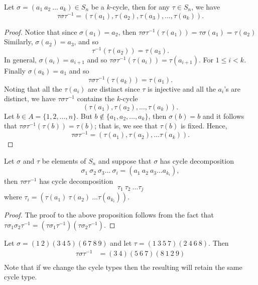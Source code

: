 \begin{lemma}
    Let \( \sigma = ({a}_{1} \ {a}_{2} \ \dots \ {a}_{k}) \in {S}_{n} \) be a \( k \)-cycle, then for any \( \tau \in {S}_{n} \), we have \[ \tau \sigma \tau^{-1} = (\tau({a}_{1}), \tau({a}_{2}), \tau({a}_{3}), \dots, \tau({a}_{k})).  \]
\end{lemma}
\begin{proof}
Notice that since \( \sigma({a}_{1}) = {a}_{2} \), then \( \tau \sigma \tau^{-1} ( \tau({a}_{1})) = \tau \sigma ({a}_{1}) = \tau({a}_{2})  \) Similarly, \( \sigma({a}_{2}) = {a}_{3} \), and so  
\[  \tau^{-1}(\tau({a}_{2}))  = \tau({a}_{3}).\]
In general, \( \sigma({a}_{i}) = {a}_{i+1} \) and so \( \tau \sigma \tau^{-1} (\tau({a}_{i})) = \tau({a}_{i+1}) \). For \( 1 \leq i < k  \). Finally \( \sigma({a}_{k}) =  {a}_{1} \) and so  
\[  \tau \sigma \tau^{-1} (\tau({a}_{k})) = \tau({a}_{1}). \]
Noting that all the \( \tau({a}_{i}) \) are distinct since \( \tau  \) is injective and all the \( {a}_{i} \)'s are distinct, we have \( \tau \sigma \tau^{-1} \) contains the \( k  \)-cycle 
\[  (\tau({a}_{1}), \tau({a}_{2}), \dots, \tau({a}_{k})). \]
Let \( b \in A = \{  1, 2, \dots, n \}  \). But \( b \notin \{ {a}_{1}, {a}_{2}, \dots, {a}_{k} \}  \), then \( \sigma(b) = b \) and it follows that \( \tau \sigma \tau^{-1} (\tau(b)) = \tau(b) \); that is, we see that \( \tau(b) \) is fixed. Hence,  
\[  \tau \sigma \tau^{-1} = (\tau({a}_{1}), \tau({a}_{2}), \dots \tau({a}_{k})). \]
\end{proof}

\begin{prop}
    Let \( \sigma  \) and \( \tau \) be elements of \( {S}_{n} \) and suppose that \( \sigma  \) has cycle decomposition 
    \[  {\sigma}_{1} \ {\sigma}_{2} \ {\sigma}_{3} \dots \ {\sigma}_{i} = ({a}_{1} \ a_{2} \ {a}_{3} \dots {a}_{{k}_{i}}),  \]
    then \( \tau \sigma \tau^{-1} \) has cycle decomposition
    \[  {\tau}_{1} \ {\tau}_{2} \ \dots {\tau}_{j} \]
    where \( {\tau}_{i} = (\tau({a}_{1}) \ \tau({a}_{2}) \ \dots \tau({a}_{{k}_{i}})) \).
\end{prop}
\begin{proof}
The proof to the above proposition follows from the fact that \( \tau {\sigma}_{1} {\sigma}_{2} \tau^{-1} = (\tau {\sigma}_{1} \tau^{-1}) (\tau {\sigma}_{2} \tau^{-1}) \). 
\end{proof}

\begin{eg}
   Let \( \sigma = (1 \ 2)(3 \ 4 \ 5 )(6 \ 7 \ 8 \ 9) \) and let \( \tau = (1 \ 3 \ 5 \ 7)(2 \ 4 \ 6 \ 8) \). Then 
   \begin{align*}
       \tau \sigma \tau^{-1} &= (3 \ 4)(5 \ 6 \ 7)(8 \ 1 \ 2 \ 9) \\
   \end{align*}
   Note that if we change the cycle types then the resulting will retain the same cycle type.
\end{eg}

